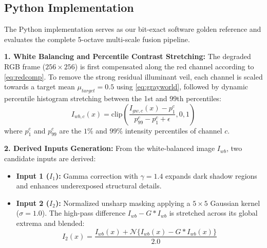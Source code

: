 \documentclass[10pt,twocolumn,letterpaper]{article}
\begin{document}
\subsection{Python Implementation}
\label{subsec:python_impl}

The Python implementation serves as our bit-exact software golden reference and evaluates the complete 5-octave multi-scale fusion pipeline.

\textbf{1. White Balancing and Percentile Contrast Stretching:} 
The degraded RGB frame ($256\times256$) is first compensated along the red channel according to \cref{eq:redcomp}. To remove the strong residual illuminant veil, each channel is scaled towards a target mean $\mu_{target} = 0.5$ using \cref{eq:grayworld}, followed by dynamic percentile histogram stretching between the 1st and 99th percentiles:
\begin{equation}
  I_{wb,c}(x) = \text{clip}\!\left(\frac{I_{gw,c}(x) - p_{1}^c}{p_{99}^c - p_{1}^c + \epsilon}, 0, 1\right)
  \label{eq:stretch_cont}
\end{equation}
where $p_1^c$ and $p_{99}^c$ are the $1\%$ and $99\%$ intensity percentiles of channel $c$.

\textbf{2. Derived Inputs Generation:} 
From the white-balanced image $I_{wb}$, two candidate inputs are derived:
\begin{itemize}
    \item \textbf{Input 1 ($I_1$):} Gamma correction with $\gamma = 1.4$ expands dark shadow regions and enhances underexposed structural details.
    \item \textbf{Input 2 ($I_2$):} Normalized unsharp masking applying a $5\times 5$ Gaussian kernel ($\sigma = 1.0$). The high-pass difference $I_{wb} - G * I_{wb}$ is stretched across its global extrema and blended:
    \begin{equation}
      I_2(x) = \frac{I_{wb}(x) + \mathcal{N}\{I_{wb}(x) - G * I_{wb}(x)\}}{2.0}
    \end{equation}
\end{itemize}
\end{document}
